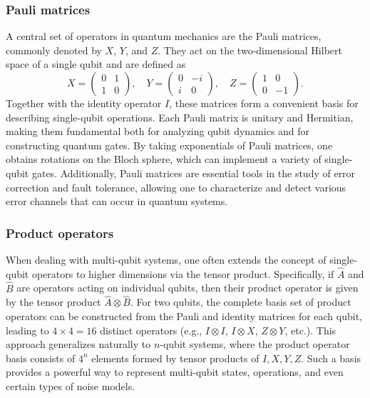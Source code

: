 \documentclass[%
 reprint,
 amsmath,amssymb,
 aps,
]{revtex4-2}
\begin{document}
\subsubsection{Pauli matrices}
A central set of operators in quantum mechanics are the Pauli matrices, commonly denoted by $X$, $Y$, and $Z$. They act on the two-dimensional Hilbert space of a single qubit and are defined as
\[
X = 
\begin{pmatrix}
0 & 1 \\
1 & 0
\end{pmatrix}, 
\quad
Y = 
\begin{pmatrix}
0 & -i \\
i & 0
\end{pmatrix}, 
\quad
Z = 
\begin{pmatrix}
1 & 0 \\
0 & -1
\end{pmatrix}.
\]
Together with the identity operator $I$, these matrices form a convenient basis for describing single-qubit operations. Each Pauli matrix is unitary and Hermitian, making them fundamental both for analyzing qubit dynamics and for constructing quantum gates. By taking exponentials of Pauli matrices, one obtains rotations on the Bloch sphere, which can implement a variety of single-qubit gates. Additionally, Pauli matrices are essential tools in the study of error correction and fault tolerance, allowing one to characterize and detect various error channels that can occur in quantum systems.

\subsubsection{Product operators}
When dealing with multi-qubit systems, one often extends the concept of single-qubit operators to higher dimensions via the tensor product. Specifically, if $\hat{A}$ and $\hat{B}$ are operators acting on individual qubits, then their product operator is given by the tensor product $\hat{A} \otimes \hat{B}$. For two qubits, the complete basis set of product operators can be constructed from the Pauli and identity matrices for each qubit, leading to $4 \times 4 = 16$ distinct operators (e.g., $I \otimes I$, $I \otimes X$, $Z \otimes Y$, etc.). This approach generalizes naturally to $n$-qubit systems, where the product operator basis consists of $4^n$ elements formed by tensor products of $I, X, Y, Z$. Such a basis provides a powerful way to represent multi-qubit states, operations, and even certain types of noise models.
\end{document}
